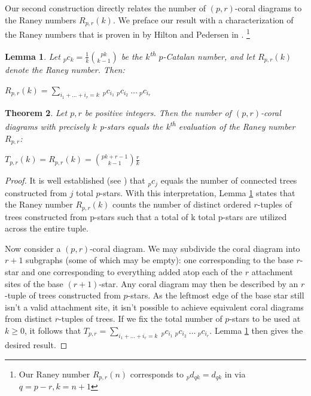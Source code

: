 \documentclass[documentfleqn,12pt]{amsart}
\newtheorem{theorem}{Theorem}[section]
\newtheorem{lemma}[theorem]{Lemma}
\begin{document}
Our second construction directly relates the number of $(p,r)$-coral diagrams to the Raney numbers $R_{p,r}(k)$.  We preface our result with a characterization of the Raney numbers that is proven in by Hilton and Pedersen in \cite{HP}. \footnote{Our Raney number $R_{p,r}(n)$ corresponds to $_pd_{qk} = d_{qk}$ in \cite{HP} via $q = p-r, k=n+1$}

\begin{lemma}\cite[Theorem 2.6]{HP}
\label{thm: HiltonPederson lemma}
Let $_pc_k = \frac{1}{k} \binom{pk}{k-1}$ be the $k$\textsuperscript{th} $p$-Catalan number, and let $R_{p,r}(k)$ denote the Raney number.  Then:

\begin{center}
$\displaystyle{R_{p,r}(k) = \sum_{i_1 + \hdots + i_r = k} \ _pc_{i_1} \ _pc_{i_2} \ \hdots \ _pc_{i_r}}$
\end{center}
\end{lemma}


\begin{theorem}
\label{thm: coral enumeration Raney numbers}
Let $p,r$ be positive integers.  Then the number of $(p,r)$-coral diagrams with precisely $k$ p-stars equals the k\textsuperscript{th} evaluation of the Raney number $R_{p,r}$:

\begin{center}
$\displaystyle{T_{p,r}(k) = R_{p,r}(k) = \binom{pk+r-1}{k-1} \frac{r}{k}}$
\end{center}
\end{theorem}
\begin{proof}
It is well established (see \cite{HP}) that $_pc_j$ equals the number of connected trees constructed from $j$ total $p$-stars.  With this interpretation, Lemma \ref{thm: HiltonPederson lemma} states that the Raney number $R_{p,r}(k)$ counts the number of distinct ordered $r$-tuples of trees constructed from p-stars such that a total of k total p-stars are utilized across the entire tuple.

Now consider a $(p,r)$-coral diagram.  We may subdivide the coral diagram into $r+1$ subgraphs (some of which may be empty): one corresponding to the base $r$-star and one corresponding to everything added atop each of the $r$ attachment sites of the base $(r+1)$-star.  Any coral diagram may then be described by an $r$-tuple of trees constructed from $p$-stars.  As the leftmost edge of the base star still isn't a valid attachment site, it isn't possible to achieve equivalent coral diagrams from distinct $r$-tuples of trees.  If we fix the total number of $p$-stars to be used at $k \geq 0$, it follows that $T_{p,r} = \displaystyle{\sum_{i_1 + \hdots + i_r = k} \ _pc_{i_1} \ _pc_{i_2} \ \hdots \ _pc_{i_r}}$.  Lemma \ref{thm: HiltonPederson lemma} then gives the desired result.
\end{proof}
\end{document}
